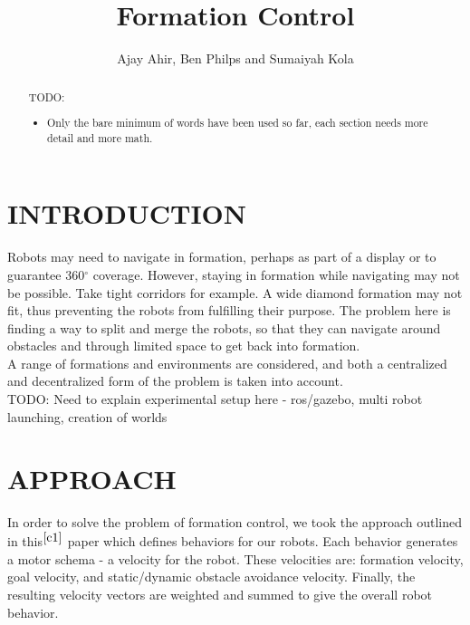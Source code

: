 \documentclass[letterpaper, 10 pt, conference]{ieeeconf}  %
\title{\LARGE \bf Formation Control}
\author{Ajay Ahir, Ben Philps and Sumaiyah Kola}
\begin{document}
\maketitle
\thispagestyle{empty}
\pagestyle{empty}

\begin{abstract}

TODO:

\begin{itemize}
\item Only the bare minimum of words have been used so far, each section needs more detail and more math.
\end{itemize}

\end{abstract}

\section{INTRODUCTION}

Robots may need to navigate in formation, perhaps as part of a display or to guarantee 360$^{\circ}$ coverage. However, staying in formation while navigating may not be possible. Take tight corridors for example. A wide diamond formation may not fit, thus preventing the robots from fulfilling their purpose. The problem here is finding a way to split and merge the robots, so that they can navigate around obstacles and through limited space to get back into formation. \\

A range of formations and environments are considered, and both a centralized and decentralized form of the problem is taken into account. \\

TODO: Need to explain experimental setup here - ros/gazebo, multi robot launching, creation of worlds

\section{APPROACH}

In order to solve the problem of formation control, we took the approach outlined in this$^{\cite{c1}}$ paper which defines behaviors for our robots. Each behavior generates a motor schema - a velocity for the robot. These velocities are: formation velocity, goal velocity, and static/dynamic obstacle avoidance velocity. Finally, the resulting velocity vectors are weighted and summed to give the overall robot behavior. \\
\end{document}
